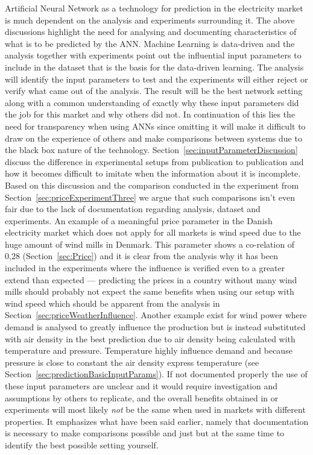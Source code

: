 Artificial Neural Network as a technology for prediction in the electricity market is much dependent on the analysis and experiments surrounding it. The above discussions highlight the need for analysing and documenting characteristics of what is to be predicted by the ANN. Machine Learning is data-driven\cite{18} and the analysis together with experiments point out the influential input parameters to include in the dataset that is the basis for the data-driven learning. The analysis will identify the input parameters to test and the experiments will either reject or verify what came out of the analysis. The result will be the best network setting along with a common understanding of exactly why these input parameters did the job for this market and why others did not. In continuation of this lies the need for transparency when using ANNs since omitting it will make it difficult to draw on the experience of others and make comparisons between systems due to the black box nature of the technology. Section~\ref{sec:inputParameterDiscussion} discuss the difference in experimental setups from publication to publication and how it becomes difficult to imitate when the information about it is incomplete. Based on this discussion and the comparison conducted in the experiment from Section~\ref{sec:priceExperimentThree} we argue that such comparisons isn't even fair due to the lack of documentation regarding analysis, dataset and experiments. An example of a meaningful price parameter in the Danish electricity market which does not apply for all markets is wind speed due to the huge amount of wind mills in Denmark. This parameter shows a co-relation of 0,28 (Section~\ref{sec:Price}) and it is clear from the analysis why it has been included in the experiments where the influence is verified even to a greater extend than expected --- predicting the prices in a country without many wind mills should probably not expect the same benefits when using our setup with wind speed which should be apparent from the analysis in Section~\ref{sec:priceWeatherInfluence}. Another example exist for wind power where demand is analysed to greatly influence the production but is instead substituted with air density in the best prediction due to air density being calculated with temperature and pressure. Temperature highly influence demand and because pressure is close to constant the air density express temperature (see Section~\ref{sec:predictionBasicInputParams}). If not documented properly the use of these input parameters are unclear and it would require investigation and assumptions by others to replicate, and the overall benefits obtained in or experiments will most likely \emph{not} be the same when used in markets with different properties. It emphasizes what have been said earlier, namely that documentation is necessary to make comparisons possible and just but at the same time to identify the best possible setting yourself. 




